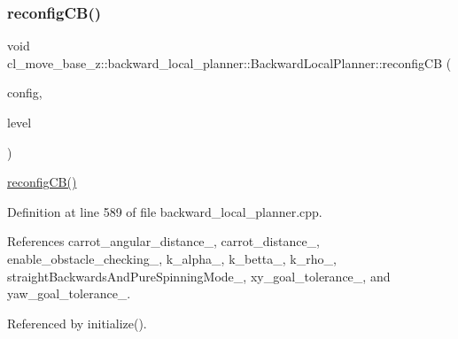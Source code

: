 \subsubsection{\texorpdfstring{reconfig\+C\+B()}{reconfigCB()}}
{\footnotesize\ttfamily void cl\+\_\+move\+\_\+base\+\_\+z\+::backward\+\_\+local\+\_\+planner\+::\+Backward\+Local\+Planner\+::reconfig\+CB (\begin{DoxyParamCaption}\item[{\+::backward\+\_\+local\+\_\+planner\+::\+Backward\+Local\+Planner\+Config \&}]{config,  }\item[{uint32\+\_\+t}]{level }\end{DoxyParamCaption})\hspace{0.3cm}{\ttfamily [private]}}

\hyperlink{classcl__move__base__z_1_1backward__local__planner_1_1BackwardLocalPlanner_a62e4783adae03ce92190d855a021b91d}{reconfig\+C\+B()} 

Definition at line 589 of file backward\+\_\+local\+\_\+planner.\+cpp.



References carrot\+\_\+angular\+\_\+distance\+\_\+, carrot\+\_\+distance\+\_\+, enable\+\_\+obstacle\+\_\+checking\+\_\+, k\+\_\+alpha\+\_\+, k\+\_\+betta\+\_\+, k\+\_\+rho\+\_\+, straight\+Backwards\+And\+Pure\+Spinning\+Mode\+\_\+, xy\+\_\+goal\+\_\+tolerance\+\_\+, and yaw\+\_\+goal\+\_\+tolerance\+\_\+.



Referenced by initialize().


